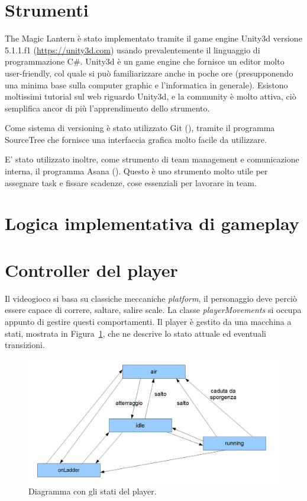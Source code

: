 \section{Strumenti}

The Magic Lantern è stato implementato tramite il game engine Unity3d versione 5.1.1.f1 (\url{https://unity3d.com}) usando prevalentemente il linguaggio di programmazione C\#. Unity3d è un game engine che fornisce un editor molto user-friendly, col quale si può familiarizzare anche in poche ore (presupponendo una minima base sulla computer graphic e l'informatica in generale). Esistono moltissimi tutorial sul web riguardo Unity3d, e la community è molto attiva, ciò semplifica ancor di più l'apprendimento dello strumento.

Come sistema di versioning è stato utilizzato Git (\cite{github}), tramite il programma SourceTree che fornisce una interfaccia grafica molto facile da utilizzare.

E' stato utilizzato inoltre, come strumento di team management e comunicazione interna, il programma Asana (\cite{asana}). Questo è uno strumento molto utile per assegnare task e fissare scadenze, cose essenziali per lavorare in team.


\section{Logica implementativa di gameplay}

\section{Controller del player}
\label{sec:player_movements}

Il videogioco si basa su classiche meccaniche \textit{platform}, il personaggio deve perciò essere capace di correre, saltare, salire scale. La classe \textit{playerMovements} si occupa appunto di gestire questi comportamenti.
Il player è gestito da una macchina a stati, mostrata in Figura~\ref{fig:development_player_stati}, che ne descrive lo stato attuale ed eventuali transizioni.

\begin{figure}%
	\centering
	\includegraphics[width= 0.9\columnwidth]{images/development/player.jpg}
	\caption{Diagramma con gli stati del player.}
	\label{fig:development_player_stati}
\end{figure}

